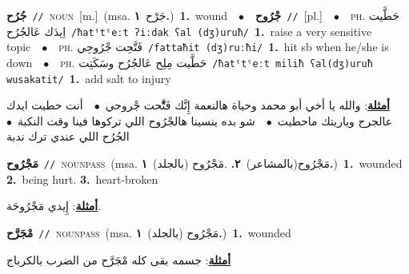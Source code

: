 \documentclass[10pt,a4paper,twoside]{article} %
\begin{document}
\begin{multicols}{2}
{\setlength\topsep{0pt}\textbf{\foreignlanguage{arabic}{جُرُح}}\ {\color{gray}\texttt{//}\color{black}}\ \textsc{noun}\ [m.]\ \color{gray}(msa. \foreignlanguage{arabic}{جَرْح}~\foreignlanguage{arabic}{\textbf{١.}})\color{black}\ \textbf{1.}~wound\ \ $\bullet$\ \ \setlength\topsep{0pt}\textbf{\foreignlanguage{arabic}{جْرُوح}}\ {\color{gray}\texttt{//}\color{black}}\ [pl.]\ \ $\bullet$\ \ \textsc{ph.} \color{gray} \foreignlanguage{arabic}{حَطَّيت اِيدَك عَالجُرُح}\color{black}\ {\color{gray}\texttt{/{\sffamily ħatˤtˤeːt ʔiːdak ʕal (dʒ)uruħ}/}\color{black}}\ \textbf{1.}~raise a very sensitive topic\ \ $\bullet$\ \ \textsc{ph.} \color{gray} \foreignlanguage{arabic}{فَتَّحِت جْرُوحِي}\color{black}\ {\color{gray}\texttt{/{\sffamily fattaħit (dʒ)ruːħi}/}\color{black}}\ \textbf{1.}~hit sb when he/she is down\ \ $\bullet$\ \ \textsc{ph.} \color{gray} \foreignlanguage{arabic}{حَطَّيت مِلِح عَالجُرُح وسَكَتِت}\color{black}\ {\color{gray}\texttt{/{\sffamily ħatˤtˤeːt miliħ ʕal(dʒ)uruħ wusakatit}/}\color{black}}\ \textbf{1.}~add salt to injury\  \begin{flushright}\color{gray}\foreignlanguage{arabic}{\textbf{\underline{\foreignlanguage{arabic}{أمثلة}}}: والله يا أخي أبو محمد وحياة هالنعمة إِنَّك فَتَّْحت جْروحي\ $\bullet$\ \  أنت حطيت ايدك عالجرح وياريتك ماحطيت\ $\bullet$\ \  شو بده ينسينا هالجْرُوح اللي تركوها فينا وقت النكبة\ $\bullet$\ \  الجُرُح اللي عندي ترك ندبة}\end{flushright}\color{black}} \vspace{2mm}

{\setlength\topsep{0pt}\textbf{\foreignlanguage{arabic}{مَجْرُوح}}\ {\color{gray}\texttt{//}\color{black}}\ \textsc{noun\textunderscore pass}\ \color{gray}(msa. \foreignlanguage{arabic}{مَجْرُوح(بالمشاعر)}~\foreignlanguage{arabic}{\textbf{٢.}}  .\foreignlanguage{arabic}{مَجْرُوح (بالجلد)}~\foreignlanguage{arabic}{\textbf{١.}})\color{black}\ \textbf{1.}~wounded  \textbf{2.}~being hurt.  \textbf{3.}~heart-broken\  \begin{flushright}\color{gray}\foreignlanguage{arabic}{\textbf{\underline{\foreignlanguage{arabic}{أمثلة}}}: إِيدي مَجْرُوحَة.}\end{flushright}\color{black}} \vspace{2mm}

{\setlength\topsep{0pt}\textbf{\foreignlanguage{arabic}{مْجَرَّح}}\ {\color{gray}\texttt{//}\color{black}}\ \textsc{noun\textunderscore pass}\ \color{gray}(msa. \foreignlanguage{arabic}{مَجْرُوح (بالجلد)}~\foreignlanguage{arabic}{\textbf{١.}})\color{black}\ \textbf{1.}~wounded\  \begin{flushright}\color{gray}\foreignlanguage{arabic}{\textbf{\underline{\foreignlanguage{arabic}{أمثلة}}}: جسمه بقى كله مْجَرَّح من الضرب بالكرباج}\end{flushright}\color{black}} \vspace{2mm}


\end{multicols}
\end{document}
